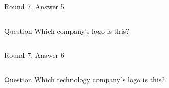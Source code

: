 \documentclass[11pt]{beamer}
\begin{document}
\begin{frame}[t]{Round 7, Answer 5}
\begin{columns}[T,totalwidth=\linewidth]
\begin{column}{0.32\linewidth}
\begin{block}{Question}
Which company's logo is this?
\end{block}
\end{column}
\begin{column}{0.65\linewidth}
\begin{center}
\texttt{[image: \{Images/morton]}.png}
\end{center}
\end{column}
\end{columns}
\end{frame}
\begin{frame}[t]{Round 7, Answer 6}
\begin{columns}[T,totalwidth=\linewidth]
\begin{column}{0.32\linewidth}
\begin{block}{Question}
Which technology company's logo is this?
\end{block}
\end{column}
\begin{column}{0.65\linewidth}
\begin{center}
\texttt{[image: \{Images/nvidia-logo]}.jpg}
\end{center}
\end{column}
\end{columns}
\end{frame}
\end{document}
